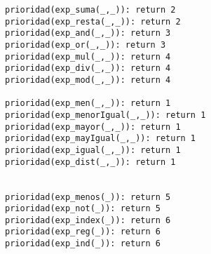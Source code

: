 \begin{lstlisting}
prioridad(exp_suma(_,_)): return 2
prioridad(exp_resta(_,_)): return 2
prioridad(exp_and(_,_)): return 3
prioridad(exp_or(_,_)): return 3
prioridad(exp_mul(_,_)): return 4
prioridad(exp_div(_,_)): return 4
prioridad(exp_mod(_,_)): return 4

prioridad(exp_men(_,_)): return 1
prioridad(exp_menorIgual(_,_)): return 1
prioridad(exp_mayor(_,_)): return 1
prioridad(exp_mayIgual(_,_)): return 1
prioridad(exp_igual(_,_)): return 1
prioridad(exp_dist(_,_)): return 1


prioridad(exp_menos(_)): return 5
prioridad(exp_not(_)): return 5
prioridad(exp_index(_)): return 6
prioridad(exp_reg(_)): return 6
prioridad(exp_ind(_)): return 6




\end{lstlisting}